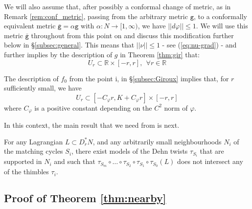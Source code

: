  We will also assume that, after possibly a conformal change of metric, as in  Remark \ref{rem:conf_metric}, passing from the arbitrary metric $\mathtt{g}$, to a conformally equivalent metric $\bar{\mathtt{g}}=\alpha \mathtt{g}$ with $\alpha:N\to [1,\infty)$, we have $||d\varphi||\leq 1$.  We will use this metric $\bar{\mathtt{g}}$ throughout from this point on and discuss this modification further below in \S\ref{subsec:general}. 
 This means that
$||\nu ||\leq 1$ - see (\ref{eq:nu-grad}) - and further implies by the description of $g$ in Theorem \ref{thm:gir} that:
\begin{equation}\label{eq:width}
U_{r}\subset \mathbb{R}\times [-r,r], \ \  \forall r \in \mathbb{R}
\end{equation} 

The description of $f_{0}$ from the point i, in \S\ref{subsec:Giroux} implies that, for $r$ sufficiently small, we  have 
\begin{equation}\label{eq:length}
U_{r}\subset [- C_{\varphi} r , K + C_{\varphi} r]\times [-r,r]
\end{equation}
where $C_{\varphi}$ is a positive constant depending on the $C^{2}$ norm
of $\varphi$.

In this context, the main result that we need from \cite{Bi-Co:lefcob-pub} is next.

\begin{prop} \label{prop:disj}For any Lagrangian $L\subset D^{\ast}_{r}N$, and any arbitrarily small neighbourhoods $N_{i}$ of the  matching cycles $S_{i}$,  there exist models of the Dehn twists $\tau_{S_{i}}$ that are  supported in $N_{i}$ and  such that  $\tau_{S_{m}} \circ \ldots  \circ \tau_{S_{2}}\circ \tau_{S_{1}}\circ \tau_{S_{0}}(L)$ does not intersect any of the thimbles $\tau_{i}$.
\end{prop}

\subsection{Proof of Theorem \ref{thm:nearby}}\label{subsec:finish-proof}

